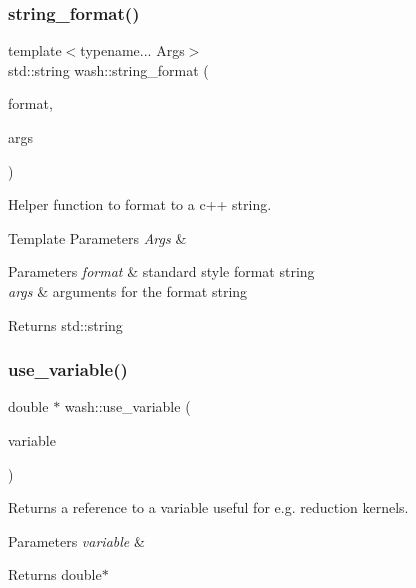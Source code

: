 \subsubsection{\texorpdfstring{string\+\_\+format()}{string\_format()}}
{\footnotesize\ttfamily template$<$typename... Args$>$ \\
std\+::string wash\+::string\+\_\+format (\begin{DoxyParamCaption}\item[{const std\+::string \&}]{format,  }\item[{Args...}]{args }\end{DoxyParamCaption})}



Helper function to format to a c++ string. 


\begin{DoxyTemplParams}{Template Parameters}
{\em Args} & \\
\hline
\end{DoxyTemplParams}

\begin{DoxyParams}{Parameters}
{\em format} & standard style format string \\
\hline
{\em args} & arguments for the format string \\
\hline
\end{DoxyParams}
\begin{DoxyReturn}{Returns}
std\+::string 
\end{DoxyReturn}
\mbox{\label{namespacewash_ad9a1f6575e74c6c12ddbae8d58c2b478}} 
\subsubsection{\texorpdfstring{use\+\_\+variable()}{use\_variable()}}
{\footnotesize\ttfamily double $\ast$ wash\+::use\+\_\+variable (\begin{DoxyParamCaption}\item[{const std\+::string \&}]{variable }\end{DoxyParamCaption})}



Returns a reference to a variable useful for e.\+g. reduction kernels. 


\begin{DoxyParams}{Parameters}
{\em variable} & \\
\hline
\end{DoxyParams}
\begin{DoxyReturn}{Returns}
double$\ast$ 
\end{DoxyReturn}
